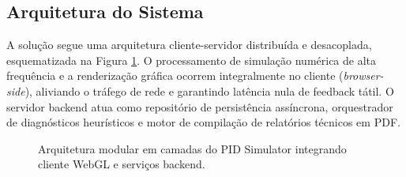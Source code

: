 \subsection{Arquitetura do Sistema}
\label{subsec:arquitetura_sistema}

A solução segue uma arquitetura cliente-servidor distribuída e desacoplada, esquematizada na Figura \ref{fig:arquitetura_geral}. O processamento de simulação numérica de alta frequência e a renderização gráfica ocorrem integralmente no cliente (\textit{browser-side}), aliviando o tráfego de rede e garantindo latência nula de feedback tátil. O servidor backend atua como repositório de persistência assíncrona, orquestrador de diagnósticos heurísticos e motor de compilação de relatórios técnicos em PDF.

\begin{figure}[htbp]
    \centering
    \caption{Arquitetura modular em camadas do PID Simulator integrando cliente WebGL e serviços backend.}
    \label{fig:arquitetura_geral}
    \vspace{0.1cm}
\end{figure}


